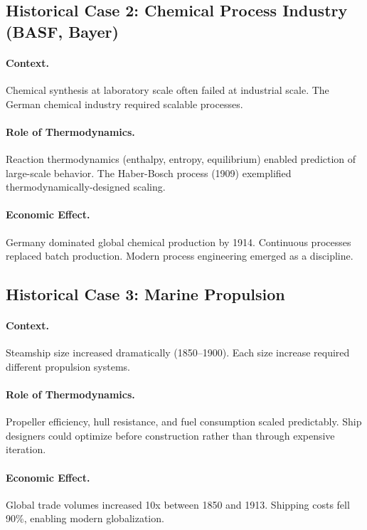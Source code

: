 \subsection{Historical Case 2: Chemical Process Industry (BASF, Bayer)}

\paragraph{Context.} Chemical synthesis at laboratory scale often failed at
industrial scale. The German chemical industry required scalable processes.

\paragraph{Role of Thermodynamics.} Reaction thermodynamics (enthalpy,
entropy, equilibrium) enabled prediction of large-scale behavior. The
Haber-Bosch process (1909) exemplified thermodynamically-designed scaling.

\paragraph{Economic Effect.} Germany dominated global chemical production by
1914. Continuous processes replaced batch production. Modern process
engineering emerged as a discipline.

\subsection{Historical Case 3: Marine Propulsion}

\paragraph{Context.} Steamship size increased dramatically (1850--1900).
Each size increase required different propulsion systems.

\paragraph{Role of Thermodynamics.} Propeller efficiency, hull resistance,
and fuel consumption scaled predictably. Ship designers could optimize
before construction rather than through expensive iteration.

\paragraph{Economic Effect.} Global trade volumes increased 10x between 1850
and 1913. Shipping costs fell 90\%, enabling modern globalization.


